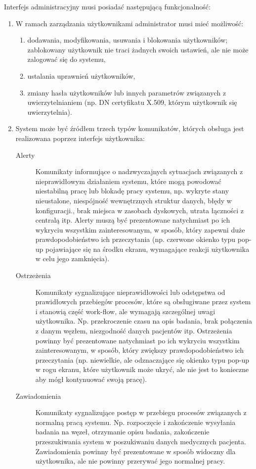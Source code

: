 \documentclass[a4paper]{report}
\begin{document}
\begin{enumerate}
Interfejs administracyjny musi posiadać następującą funkcjonalność:
\begin{enumerate}
  \item W ramach zarządzania użytkownikami administrator musi mieć możliwość:
    \begin{enumerate}
      \item dodawania, modyfikowania, usuwania i blokowania użytkowników; zablokowany użytkownik nie traci żadnych swoich ustawień, ale nie może zalogować się do systemu,
      \item ustalania uprawnień użytkowników,
      \item zmiany hasła użytkowników lub innych parametrów związanych z uwierzytelnianiem (np. DN certyfikatu X.509, którym użytkownik się uwierzytelnia).
    \end{enumerate}

  \item System może być źródłem trzech typów komunikatów, których obsługa jest realizowana poprzez interfejs użytkownika:
    \begin{description}
      \item[Alerty] Komunikaty informujące o nadzwyczajnych sytuacjach związanych z nieprawidłowym działaniem systemu, które mogą powodować niestabilną pracę lub blokadę pracy systemu, np. wykryte stany nieustalone, niespójność wewnętrznych struktur danych, błędy w konfiguracji., brak miejsca w zasobach dyskowych, utrata łączności z centralą itp. Alerty muszą być prezentowane natychmiast po ich wykryciu wszystkim zainteresowanym, w sposób, który zapewni duże prawdopodobieństwo ich przeczytania (np. czerwone okienko typu pop-up pojawiające się na środku ekranu, wymagające reakcji użytkownika w celu jego zamknięcia).

      \item[Ostrzeżenia] Komunikaty sygnalizujące nieprawidłowości lub odstępstwa od prawidłowych przebiegów procesów, które są obsługiwane przez system i stanowią część work-flow, ale wymagają szczególnej uwagi użytkownika. Np. przekroczenie czasu na opis badania, brak połączenia z danym węzłem, niezgodność danych pacjentów itp. Ostrzeżenia powinny być prezentowane natychmiast po ich wykryciu wszystkim zainteresowanym, w sposób, który zwiększy prawdopodobieństwo ich przeczytania (np. niewielkie, ale odznaczające się okienko typu pop-up w rogu ekranu, które użytkownik może ukryć, ale nie jest to konieczne aby mógł kontynuować swoją pracę).

      \item[Zawiadomienia] Komunikaty sygnalizujące postęp w przebiegu procesów związanych z normalną pracą systemu. Np. rozpoczęcie i zakończenie wysyłania badania na węzeł, otrzymanie opisu badania, zakończenie przeszukiwania system w poszukiwaniu danych medycznych pacjenta. Zawiadomienia powinny być prezentowane w sposób widoczny dla użytkownika, ale nie powinny przerywać jego normalnej pracy.
    \end{description}


\end{enumerate}
\end{enumerate}
\end{document}

